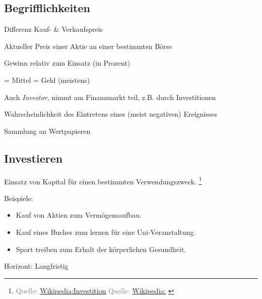 \documentclass{beamer}
\let\oldfootnote\footnote
\renewcommand{\footnote}[1]
{%
	\oldfootnote
	{
		\tiny
		\textcolor{gray}{#1}
	}%
}
\newcommand{\citewiki}[2][]
{%
	\footnote
	{
		\ifthenelse{\isempty{#1}}
		{
			Quelle: \href{https://de.wikipedia.org/wiki/#2}{Wikipedia:#2}
		}
		{
			Quelle: \href{https://de.wikipedia.org/wiki/#2}{Wikipedia:#1}
		}
	}
}
\begin{document}
		\begin{frame}
		\end{frame}
	
		\subsection{Begrifflichkeiten}
		
		\begin{frame}
			\begin{description}[labelwidth=0cm]
				\item[Gewinn/Verlust] Differenz Kauf- \& Verkaufspreis\pause
				\item[Kurs] Aktueller Preis einer Aktie an einer bestimmten Börse\pause
				\item[Rendite] Gewinn relativ zum Einsatz (in Prozent)\pause
				\item[Kapital] = Mittel = Geld (meistens)\pause
				\item[Anleger] Auch \textit{Investor}, nimmt am Finanzmarkt teil, z.B. durch Investitionen\pause
				\item[Risiko] Wahrscheinlichkeit des Eintretens eines (meist negativen) Ereignisses\pause
				\item[Portfolio] Sammlung an Wertpapieren
			\end{description}
		\end{frame}
		
		\subsection{Investieren}
		
			\begin{frame}
				\begin{definition}
					Einsatz von Kapital für einen bestimmten Verwendungszweck.\citewiki{Investition}
				\end{definition}\hfill
			
				Beispiele:
				\begin{itemize}
					\item Kauf von Aktien zum Vermögensaufbau.
					\item Kauf eines Buches zum lernen für eine Uni-Veranstaltung.
					\item Sport treiben zum Erhalt der körperlichen Gesundheit.
				\end{itemize}\hfill
			
				Horizont: Langfristig
			\end{frame}
		
\end{document}
